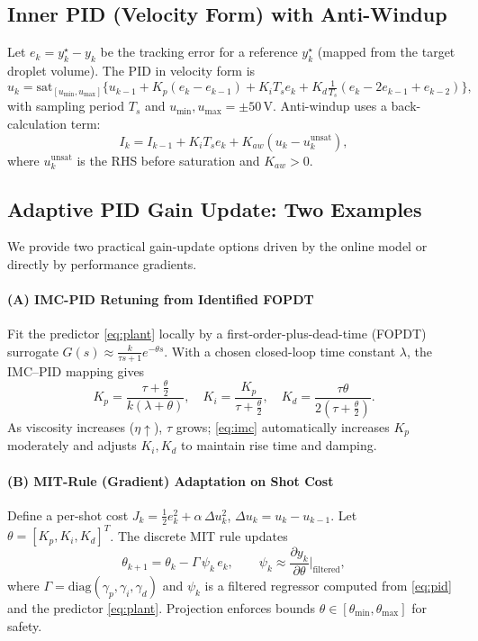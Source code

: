 \subsection{Inner PID (Velocity Form) with Anti-Windup}
Let $e_k = y_k^{\star} - y_k$ be the tracking error for a reference $y_k^{\star}$ (mapped from the
target droplet volume). The PID in velocity form is
\begin{equation}
u_k = \mathrm{sat}_{[u_{\min},u_{\max}]}\Big\{u_{k-1}
+ K_p (e_k - e_{k-1}) + K_i T_s e_k
+ K_d \tfrac{1}{T_s}(e_k - 2e_{k-1} + e_{k-2}) \Big\},
\label{eq:pid}
\end{equation}
with sampling period $T_s$ and $u_{\min},u_{\max}=\pm 50\,\mathrm{V}$.
Anti-windup uses a back-calculation term:
\begin{equation}
I_k = I_{k-1} + K_i T_s e_k + K_{aw}(u_k - u_k^{\text{unsat}}),
\end{equation}
where $u_k^{\text{unsat}}$ is the RHS before saturation and $K_{aw}>0$.

\subsection{Adaptive PID Gain Update: Two Examples}
We provide two practical gain-update options driven by the online model
or directly by performance gradients.

\paragraph*{(A) IMC-PID Retuning from Identified FOPDT}
Fit the predictor \eqref{eq:plant} locally by a first-order-plus-dead-time (FOPDT) surrogate
$G(s)\approx \frac{k}{\tau s+1}e^{-\theta s}$. With a chosen closed-loop time constant $\lambda$,
the IMC--PID mapping gives
\begin{equation}
K_p = \frac{\tau+\tfrac{\theta}{2}}{k(\lambda+\theta)},\quad
K_i = \frac{K_p}{\tau+\tfrac{\theta}{2}},\quad
K_d = \frac{\tau\theta}{2(\tau+\tfrac{\theta}{2})}.
\label{eq:imc}
\end{equation}
As viscosity increases ($\eta\uparrow$), $\tau$ grows; \eqref{eq:imc} automatically increases $K_p$
moderately and adjusts $K_i,K_d$ to maintain rise time and damping.

\paragraph*{(B) MIT-Rule (Gradient) Adaptation on Shot Cost}
Define a per-shot cost $J_k=\tfrac{1}{2}e_k^2 + \alpha\,\Delta u_k^2$, $\Delta u_k=u_k-u_{k-1}$.
Let $\theta=[K_p,K_i,K_d]^T$. The discrete MIT rule updates
\begin{equation}
\theta_{k+1}=\theta_k - \Gamma\,\psi_k\,e_k,\qquad
\psi_k \approx \frac{\partial y_k}{\partial \theta}\Big|_{\text{filtered}},
\end{equation}
where $\Gamma=\mathrm{diag}(\gamma_p,\gamma_i,\gamma_d)$ and $\psi_k$ is a filtered regressor
computed from \eqref{eq:pid} and the predictor \eqref{eq:plant}.
Projection enforces bounds $\theta\in[\theta_{\min},\theta_{\max}]$ for safety.

